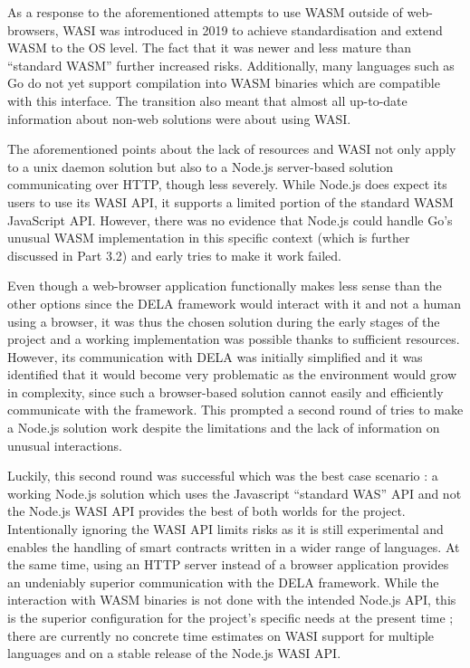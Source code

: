 \documentclass[11pt, a4paper, twoside, openright]{article}
\begin{document}
As a response to the aforementioned attempts to use WASM outside of web-browsers, WASI was introduced in 2019 to achieve standardisation and extend WASM to the OS level. The fact that it was newer and less mature than ``standard WASM'' further increased risks. Additionally, many languages such as Go do not yet support compilation into WASM binaries which are compatible with this interface. The transition also meant that almost all up-to-date information about non-web solutions were about using WASI.

The aforementioned points about the lack of resources and WASI not only apply to a unix daemon solution but also to a Node.js server-based solution communicating over HTTP, though less severely. While Node.js does expect its users to use its WASI API, it supports a limited portion of the standard WASM JavaScript API. However, there was no evidence that Node.js could handle Go's unusual WASM implementation in this specific context (which is further discussed in Part 3.2) and early tries to make it work failed.

Even though a web-browser application functionally makes less sense than the other options since the DELA framework would interact with it and not a human using a browser, it was thus the chosen solution during the early stages of the project and a working implementation was possible thanks to sufficient resources. However, its communication with DELA was initially simplified and it was identified that it would become very problematic as the environment would grow in complexity, since such a browser-based solution cannot easily and efficiently communicate with the framework. This prompted a second round of tries to make a Node.js solution work despite the limitations and the lack of information on unusual interactions.

Luckily, this second round was successful which was the best case scenario : a working Node.js solution which uses the Javascript ``standard WAS'' API and not the Node.js WASI API provides the best of both worlds for the project. Intentionally ignoring the WASI API limits risks as it is still experimental and enables the handling of smart contracts written in a wider range of languages. At the same time, using an HTTP server instead of a browser application provides an undeniably superior communication with the DELA framework. While the interaction with WASM binaries is not done with the intended Node.js API, this is the superior configuration for the project's specific needs at the present time ; there are currently no concrete time estimates on WASI support for multiple languages and on a stable release of the Node.js WASI API.
\end{document}
